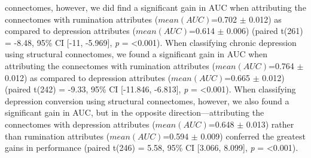 \documentclass[
  notitlepage]{article}
\begin{document}
connectomes, however, we did find a significant gain in AUC when
attributing the connectomes with rumination attributes
(\(mean(AUC)\)=0.702 \(\pm\) 0.012) as compared to depression attributes
(\(mean(AUC)\)=0.614 \(\pm\) 0.006) (paired t(261) = -8.48, 95\% CI
{[}-11, -5.969{]}, \emph{p} = \textless0.001). When classifying chronic
depression using structural connectomes, we found a significant gain in
AUC when attributing the connectomes with rumination attributes
(\(mean(AUC)\)=0.764 \(\pm\) 0.012) as compared to depression attributes
(\(mean(AUC)\)=0.665 \(\pm\) 0.012)(paired t(242) = -9.33, 95\% CI
{[}-11.846, -6.813{]}, \emph{p} = \textless0.001). When classifying
depression conversion using structural connectomes, however, we also
found a significant gain in AUC, but in the opposite
direction---attributing the connectomes with depression attributes
(\(mean(AUC)\)=0.648 \(\pm\) 0.013) rather than rumination attributes
(\(mean(AUC)\)=0.594 \(\pm\) 0.009) conferred the greatest gains in
performance (paired t(246) = 5.58, 95\% CI {[}3.066, 8.099{]}, \emph{p}
= \textless0.001).
\end{document}
